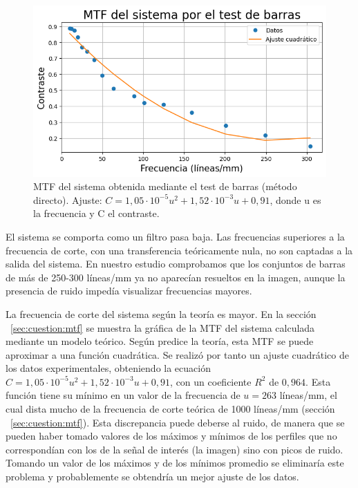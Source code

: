 \documentclass{./packages/optica-article}
\begin{document}
\begin{figure}
    \centering
    \includegraphics[scale=0.5]{MTF-directo.png}
    \caption{MTF del sistema obtenida mediante el test de barras (método directo). Ajuste: $C = 1,05 \cdot 10^{-5} u^2 + 1,52 \cdot 10^{-3} u + 0,91$, donde u es la frecuencia y C el contraste.}
    \label{fig:mtf-directo}
\end{figure}

El sistema se comporta como un filtro pasa baja. Las frecuencias superiores a la frecuencia de corte, con una transferencia teóricamente nula, no son captadas a la salida del sistema. En nuestro estudio comprobamos que los conjuntos de barras de más de 250-300 líneas/mm ya no aparecían resueltos en la imagen, aunque la presencia de ruido impedía visualizar frecuencias mayores. 

La frecuencia de corte del sistema según la teoría es mayor. En la sección ~\ref{sec:cuestion:mtf} se muestra la gráfica de la MTF del sistema calculada mediante un modelo teórico. Según predice la teoría, esta MTF se puede aproximar a una función cuadrática. Se realizó por tanto un ajuste cuadrático de los datos experimentales, obteniendo la ecuación $C = 1,05 \cdot 10^{-5} u^2 + 1,52 \cdot 10^{-3} u + 0,91$, con un coeficiente $R^2$ de $0,964$. Esta función tiene su mínimo en un valor de la frecuencia de $u = 263$ líneas/mm, el cual dista mucho de la frecuencia de corte teórica de 1000 líneas/mm (sección ~\ref{sec:cuestion:mtf}). Esta discrepancia puede deberse al ruido, de manera que se pueden haber tomado valores de los máximos y mínimos de los perfiles que no correspondían con los de la señal de interés (la imagen) sino con picos de ruido. Tomando un valor de los máximos y de los mínimos promedio se eliminaría este problema y probablemente se obtendría un mejor ajuste de los datos.
\end{document}
